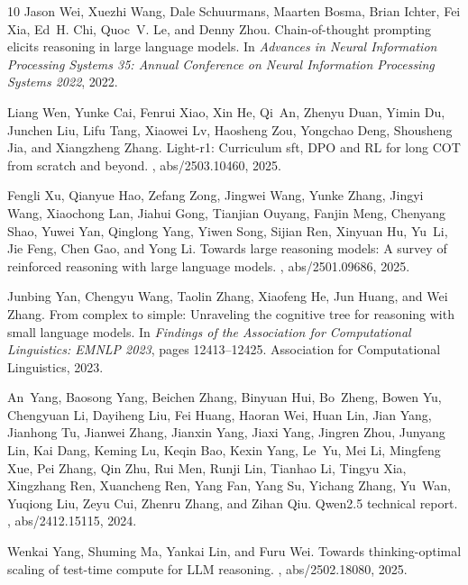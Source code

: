 \documentclass{article}
\begin{document}
{\begin{thebibliography}{10}
        Jason Wei, Xuezhi Wang, Dale Schuurmans, Maarten Bosma, Brian Ichter, Fei Xia, Ed~H. Chi, Quoc~V. Le, and Denny Zhou.
        \newblock Chain-of-thought prompting elicits reasoning in large language models.
        \newblock In {\em Advances in Neural Information Processing Systems 35: Annual Conference on Neural Information Processing Systems 2022}, 2022.
        
        Liang Wen, Yunke Cai, Fenrui Xiao, Xin He, Qi~An, Zhenyu Duan, Yimin Du, Junchen Liu, Lifu Tang, Xiaowei Lv, Haosheng Zou, Yongchao Deng, Shousheng Jia, and Xiangzheng Zhang.
        \newblock Light-r1: Curriculum sft, {DPO} and {RL} for long {COT} from scratch and beyond.
        , abs/2503.10460, 2025.
        
        Fengli Xu, Qianyue Hao, Zefang Zong, Jingwei Wang, Yunke Zhang, Jingyi Wang, Xiaochong Lan, Jiahui Gong, Tianjian Ouyang, Fanjin Meng, Chenyang Shao, Yuwei Yan, Qinglong Yang, Yiwen Song, Sijian Ren, Xinyuan Hu, Yu~Li, Jie Feng, Chen Gao, and Yong Li.
        \newblock Towards large reasoning models: {A} survey of reinforced reasoning with large language models.
        , abs/2501.09686, 2025.
        
        Junbing Yan, Chengyu Wang, Taolin Zhang, Xiaofeng He, Jun Huang, and Wei Zhang.
        \newblock From complex to simple: Unraveling the cognitive tree for reasoning with small language models.
        \newblock In {\em Findings of the Association for Computational Linguistics: {EMNLP} 2023}, pages 12413--12425. Association for Computational Linguistics, 2023.
        
        An~Yang, Baosong Yang, Beichen Zhang, Binyuan Hui, Bo~Zheng, Bowen Yu, Chengyuan Li, Dayiheng Liu, Fei Huang, Haoran Wei, Huan Lin, Jian Yang, Jianhong Tu, Jianwei Zhang, Jianxin Yang, Jiaxi Yang, Jingren Zhou, Junyang Lin, Kai Dang, Keming Lu, Keqin Bao, Kexin Yang, Le~Yu, Mei Li, Mingfeng Xue, Pei Zhang, Qin Zhu, Rui Men, Runji Lin, Tianhao Li, Tingyu Xia, Xingzhang Ren, Xuancheng Ren, Yang Fan, Yang Su, Yichang Zhang, Yu~Wan, Yuqiong Liu, Zeyu Cui, Zhenru Zhang, and Zihan Qiu.
        \newblock Qwen2.5 technical report.
        , abs/2412.15115, 2024.
        
        Wenkai Yang, Shuming Ma, Yankai Lin, and Furu Wei.
        \newblock Towards thinking-optimal scaling of test-time compute for {LLM} reasoning.
        , abs/2502.18080, 2025.
        

\end{thebibliography}}
\end{document}
